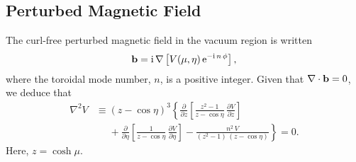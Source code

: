 \documentclass[12pt,prb,aps,notitlepage]{revtex4-1}
\begin{document}
\subsection{Perturbed Magnetic Field}
The curl-free perturbed magnetic field in the vacuum region is written
\begin{equation}
{\bf b} = {\rm i}\,\nabla \left[V(\mu,\eta)\,{\rm e}^{-{\rm i}\,n\,\phi}\right],
\end{equation}
where the toroidal mode number, $n$, is a positive integer. Given that $\nabla\cdot{\bf b}=0$, we deduce that 
\begin{align}\label{e6}
\nabla^2 V &\equiv (z-\cos\eta)^3\left\{\frac{\partial}{\partial z}\!\left[\frac{z^2-1}{z-\cos\eta}\,\frac{\partial V}{\partial z}\right]\right.\nonumber\\[0.5ex]
&\left.\phantom{=}+\frac{\partial}{\partial \eta}\!\left[\frac{1}{z-\cos\eta}\,\frac{\partial V}{\partial\eta}\right]
-\frac{n^2\,V}{(z^2-1)\,(z-\cos\eta)}\right\}=0.
\end{align}
Here, $z=\cosh\mu$. 
\end{document}
